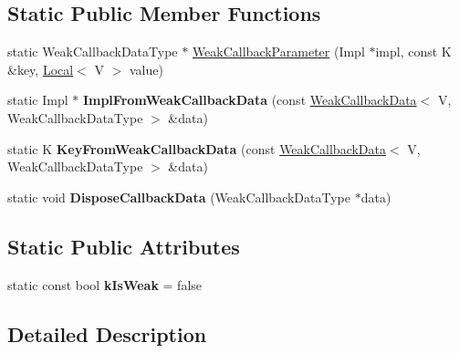 \subsection*{Static Public Member Functions}
\begin{DoxyCompactItemize}
\item 
static Weak\+Callback\+Data\+Type $\ast$ \hyperlink{classv8_1_1_strong_map_traits_a8977871a1fe616b93fee2d9fe9aa3937}{Weak\+Callback\+Parameter} (Impl $\ast$impl, const K \&key, \hyperlink{classv8_1_1_local}{Local}$<$ V $>$ value)
\item 
\hypertarget{classv8_1_1_strong_map_traits_aa510255e2992a062d5d579b77532a5b2}{}static Impl $\ast$ {\bfseries Impl\+From\+Weak\+Callback\+Data} (const \hyperlink{classv8_1_1_weak_callback_data}{Weak\+Callback\+Data}$<$ V, Weak\+Callback\+Data\+Type $>$ \&data)\label{classv8_1_1_strong_map_traits_aa510255e2992a062d5d579b77532a5b2}

\item 
\hypertarget{classv8_1_1_strong_map_traits_a0d7db65fb51e3665ff3c169fc4d13367}{}static K {\bfseries Key\+From\+Weak\+Callback\+Data} (const \hyperlink{classv8_1_1_weak_callback_data}{Weak\+Callback\+Data}$<$ V, Weak\+Callback\+Data\+Type $>$ \&data)\label{classv8_1_1_strong_map_traits_a0d7db65fb51e3665ff3c169fc4d13367}

\item 
\hypertarget{classv8_1_1_strong_map_traits_a67e81c1f8e15f180e30acf0638370635}{}static void {\bfseries Dispose\+Callback\+Data} (Weak\+Callback\+Data\+Type $\ast$data)\label{classv8_1_1_strong_map_traits_a67e81c1f8e15f180e30acf0638370635}

\end{DoxyCompactItemize}
\subsection*{Static Public Attributes}
\begin{DoxyCompactItemize}
\item 
\hypertarget{classv8_1_1_strong_map_traits_a7780caf28ee0e163fddc18fdb1868029}{}static const bool {\bfseries k\+Is\+Weak} = false\label{classv8_1_1_strong_map_traits_a7780caf28ee0e163fddc18fdb1868029}

\end{DoxyCompactItemize}


\subsection{Detailed Description}
